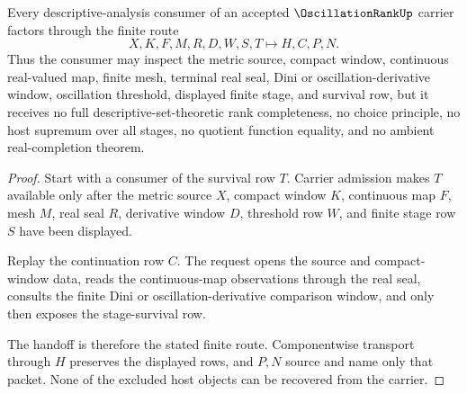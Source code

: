 \begin{theorem}
\label{thm:oscillation-rank-finite-window-handoff}
Every descriptive-analysis consumer of an accepted $\OscillationRankUp$ carrier factors through the finite route
$$
X,K,F,M,R,D,W,S,T \longmapsto H,C,P,N .
$$
Thus the consumer may inspect the metric source, compact window, continuous real-valued map, finite mesh, terminal real seal, Dini or oscillation-derivative window, oscillation threshold, displayed finite stage, and survival row, but it receives no full descriptive-set-theoretic rank completeness, no choice principle, no host supremum over all stages, no quotient function equality, and no ambient real-completion theorem.
\end{theorem}
\begin{proof}
Start with a consumer of the survival row $T$. Carrier admission makes $T$ available only after the metric source $X$, compact window $K$, continuous map $F$, mesh $M$, real seal $R$, derivative window $D$, threshold row $W$, and finite stage row $S$ have been displayed.

Replay the continuation row $C$. The request opens the source and compact-window data, reads the continuous-map observations through the real seal, consults the finite Dini or oscillation-derivative comparison window, and only then exposes the stage-survival row.

The handoff is therefore the stated finite route. Componentwise transport through $H$ preserves the displayed rows, and $P,N$ source and name only that packet. None of the excluded host objects can be recovered from the carrier.
\end{proof}


\begin{closurestatus}{\OscillationRankUp}
  \theoryclosure{\seedClosure}
  \formalstatus{\unformalizedV}
\end{closurestatus}
